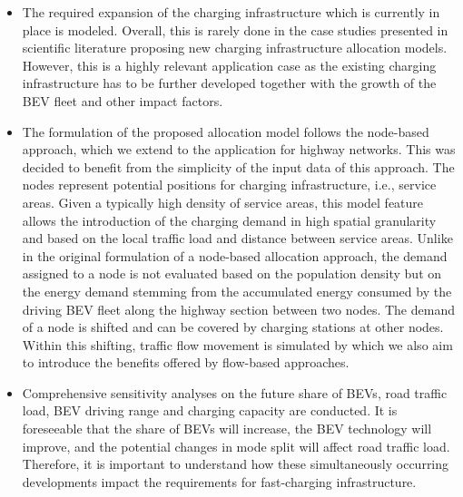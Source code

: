 \documentclass[journal,article,submit,pdftex,moreauthors]{Definitions/mdpi}
\begin{document}
    \begin{itemize}
        
        \item The required expansion of the charging infrastructure which is currently in place is modeled. Overall, this is rarely done in the case studies presented in scientific literature proposing new charging infrastructure allocation models. However, this is a highly relevant application case as the existing charging infrastructure has to be further developed together with the growth of the BEV fleet and other impact factors.
        
        \item  The formulation of the proposed allocation model follows the node-based approach, which we extend to the application for highway networks. This was decided to benefit from the simplicity of the input data of this approach. The nodes represent potential positions for charging infrastructure, i.e., service areas. Given a typically high density of service areas, this model feature allows the introduction of the charging demand in high spatial granularity and based on the local traffic load and distance between service areas. Unlike in the original formulation of a node-based allocation approach, the demand assigned to a node is not evaluated based on the population density but on the energy demand stemming from the accumulated energy consumed by the driving BEV fleet along the highway section between two nodes. The demand of a node is shifted and can be covered by charging stations at other nodes. Within this shifting, traffic flow movement is simulated by which we also aim to introduce the benefits offered by flow-based approaches. 
        
        \item Comprehensive sensitivity analyses on the future share of BEVs, road traffic load, BEV driving range and charging capacity are conducted. It is foreseeable that the share of BEVs will increase, the BEV technology will improve, and the potential changes in mode split will affect road traffic load. Therefore, it is important to understand how these simultaneously occurring developments impact the requirements for fast-charging infrastructure. 
        
        
        


    \end{itemize}
    
\end{document}
